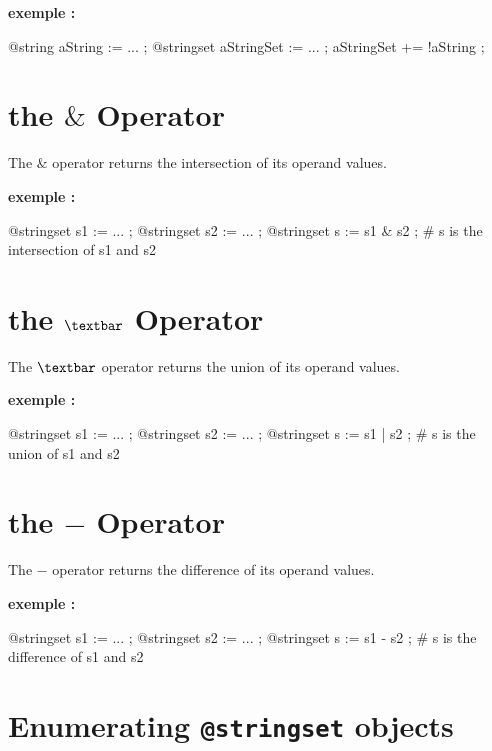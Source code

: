 \textbf{exemple :}
\begin{galgascode}
@string aString := ... ;
@stringset aStringSet := ... ;
aStringSet += !aString ;
\end{galgascode}




\section{the \emph{$\&$} Operator}

The \emph{$\&$} operator returns the intersection of its operand values.

\textbf{exemple :}
\begin{galgascode}
@stringset s1 := ... ;
@stringset s2 := ... ;
@stringset s := s1 & s2 ; # s is the intersection of s1 and s2
\end{galgascode}






\section{the \emph{$\textbar$} Operator}

The \emph{$\textbar$} operator returns the union of its operand values.

\textbf{exemple :}
\begin{galgascode}
@stringset s1 := ... ;
@stringset s2 := ... ;
@stringset s := s1 | s2 ; # s is the union of s1 and s2
\end{galgascode}






\section{the \emph{$-$} Operator}

The \emph{$-$} operator returns the difference of its operand values.

\textbf{exemple :}
\begin{galgascode}
@stringset s1 := ... ;
@stringset s2 := ... ;
@stringset s := s1 - s2 ; \# s is the difference of s1 and s2
\end{galgascode}








\section{Enumerating \texttt{@stringset} objects}


